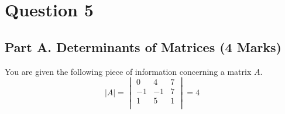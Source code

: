 \documentclass[a4paper,12pt]{article}
\begin{document}
%	
\section*{Question 5}

\subsection*{Part A. Determinants of Matrices (4 Marks)}

You are given the following piece of information concerning a matrix $A$.
\[|A| = \begin{vmatrix}
0  &  4   & 7 \\
-1  & -1  &  7\\
1   & 5  &  1\\
\end{vmatrix} = 4 \]
\end{document}
